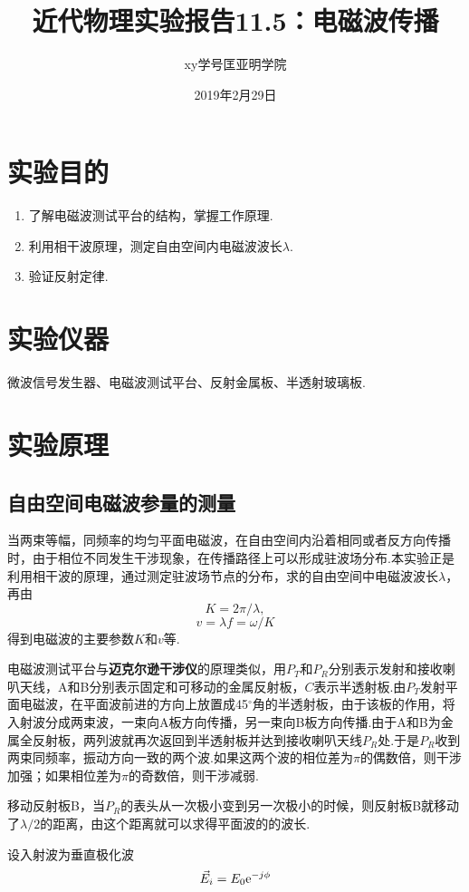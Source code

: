 \documentclass[a4paper]{article}
\title{近代物理实验报告11.5：电磁波传播}
\author{xy\quad 学号\quad 匡亚明学院}
\date{2019年2月29日}
\begin{document}
\maketitle


\section{实验目的}
\begin{enumerate}
\item 了解电磁波测试平台的结构，掌握工作原理.
\item 利用相干波原理，测定自由空间内电磁波波长$\lambda$.
\item 验证反射定律.
\end{enumerate}

\section{实验仪器}
微波信号发生器、电磁波测试平台、反射金属板、半透射玻璃板.

\section{实验原理}
\subsection{自由空间电磁波参量的测量}
当两束等幅，同频率的均匀平面电磁波，在自由空间内沿着相同或者反方向传播时，由于相位不同发生干涉现象，在传播路径上可以形成驻波场分布.本实验正是利用相干波的原理，通过测定驻波场节点的分布，求的自由空间中电磁波波长$\lambda$，再由
$$K=2\pi/\lambda,$$
$$v=\lambda f=\omega/K$$
得到电磁波的主要参数$K$和$v$等.

电磁波测试平台与\textbf{迈克尔逊干涉仪}的原理类似，用$P_T$和$P_R$分别表示发射和接收喇叭天线，A和B分别表示固定和可移动的金属反射板，$C$表示半透射板.由$P_T$发射平面电磁波，在平面波前进的方向上放置成45$^\circ$角的半透射板，由于该板的作用，将入射波分成两束波，一束向A板方向传播，另一束向B板方向传播.由于A和B为金属全反射板，两列波就再次返回到半透射板并达到接收喇叭天线$P_R$处.于是$P_R$收到两束同频率，振动方向一致的两个波.如果这两个波的相位差为$\pi$的偶数倍，则干涉加强；如果相位差为$\pi$的奇数倍，则干涉减弱.

移动反射板B，当$P_R$的表头从一次极小变到另一次极小的时候，则反射板B就移动了$\lambda/2$的距离，由这个距离就可以求得平面波的的波长.

设入射波为垂直极化波
$$\vec{E}_i=E_0{\rm e}^{-j\phi}$$
\end{document}
